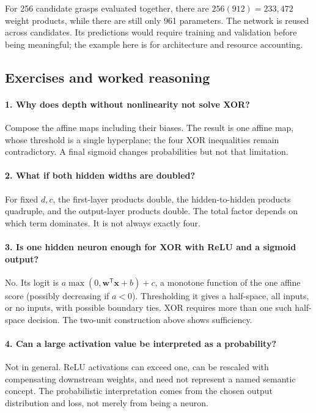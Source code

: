 For 256 candidate grasps evaluated together, there are $256(912)=233{,}472$ weight products, while there are still only 961 parameters. The network is reused across candidates. Its predictions would require training and validation before being meaningful; the example here is for architecture and resource accounting.

\subsection{Exercises and worked reasoning}
\paragraph{1. Why does depth without nonlinearity not solve XOR?}
Compose the affine maps including their biases. The result is one affine map, whose threshold is a single hyperplane; the four XOR inequalities remain contradictory. A final sigmoid changes probabilities but not that limitation.

\paragraph{2. What if both hidden widths are doubled?}
For fixed $d,c$, the first-layer products double, the hidden-to-hidden products quadruple, and the output-layer products double. The total factor depends on which term dominates. It is not always exactly four.

\paragraph{3. Is one hidden neuron enough for XOR with ReLU and a sigmoid output?}
No. Its logit is $a\max(0,\mathbf{w}^{\mathsf T}\mathbf{x}+b)+c$, a monotone function of the one affine score (possibly decreasing if $a<0$). Thresholding it gives a half-space, all inputs, or no inputs, with possible boundary ties. XOR requires more than one such half-space decision. The two-unit construction above shows sufficiency.

\paragraph{4. Can a large activation value be interpreted as a probability?}
Not in general. ReLU activations can exceed one, can be rescaled with compensating downstream weights, and need not represent a named semantic concept. The probabilistic interpretation comes from the chosen output distribution and loss, not merely from being a neuron.
